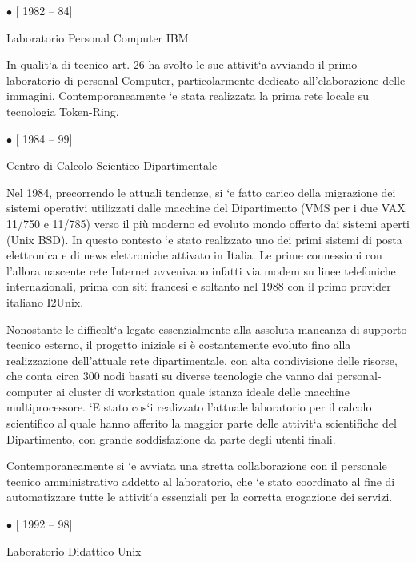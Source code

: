 \documentclass[11pt]{article}
\newlength{\posii}
\newlength{\posiibox}
\newlength{\boxsize}
\begin{document}
\begin{description}

\item \parbox[t]{\posiibox} 
{\bf \raggedright $ \bullet $ [ 1982 -- 84] \par
\medskip
Laboratorio Personal Computer IBM}
\hfill \parbox[t]{\boxsize} {

In qualit\a`a di tecnico art. 26 ha svolto le sue attivit\a`a avviando
il primo laboratorio di personal Computer, particolarmente dedicato
all'elaborazione delle immagini. Contemporaneamente \a`e stata
realizzata la prima rete locale su tecnologia Token-Ring.  }

\item \parbox[t]{\posiibox} 
{\bf \raggedright $ \bullet $ [ 1984 -- 99] \par
\medskip
Centro di Calcolo Scientico Dipartimentale}
\hfill \parbox[t]{\boxsize} {

Nel 1984, precorrendo le attuali tendenze, si \a`e fatto carico della
migrazione dei sistemi operativi utilizzati dalle macchine del
Dipartimento (VMS per i due VAX 11/750 e 11/785) verso il pi\`u
moderno ed evoluto mondo offerto dai sistemi aperti (Unix BSD).  In
questo contesto \a`e stato realizzato uno dei primi sistemi di posta
elettronica e di news elettroniche attivato in Italia. Le prime
connessioni con l'allora nascente rete Internet avvenivano infatti via
modem su linee telefoniche internazionali, prima con siti francesi e
soltanto nel 1988 con il primo provider italiano I2Unix.
 
Nonostante le difficolt\a`a legate essenzialmente alla assoluta
mancanza di supporto tecnico esterno, il progetto iniziale si \`e
costantemente evoluto fino alla realizzazione dell'attuale rete
dipartimentale, con alta condivisione delle risorse, che conta circa
300 nodi basati su diverse tecnologie che vanno dai personal-computer
ai cluster di workstation quale istanza ideale delle macchine
multiprocessore.  \a`E stato cos\a`i realizzato l'attuale laboratorio
per il calcolo scientifico al quale hanno afferito la maggior parte
delle attivit\a`a scientifiche del Dipartimento, con grande
soddisfazione da parte degli utenti finali.

Contemporaneamente si \a`e avviata una stretta collaborazione con il
personale tecnico amministrativo addetto al laboratorio, che \a`e
stato coordinato al fine di automatizzare tutte le attivit\a`a
essenziali per la corretta erogazione dei servizi.  
}


\item \parbox[t]{\posiibox} 
{\bf \raggedright $ \bullet $ [ 1992 -- 98] \par
\medskip
Laboratorio Didattico Unix}
\hfill \parbox[t]{\boxsize} {

}
\end{description}
\end{document}
